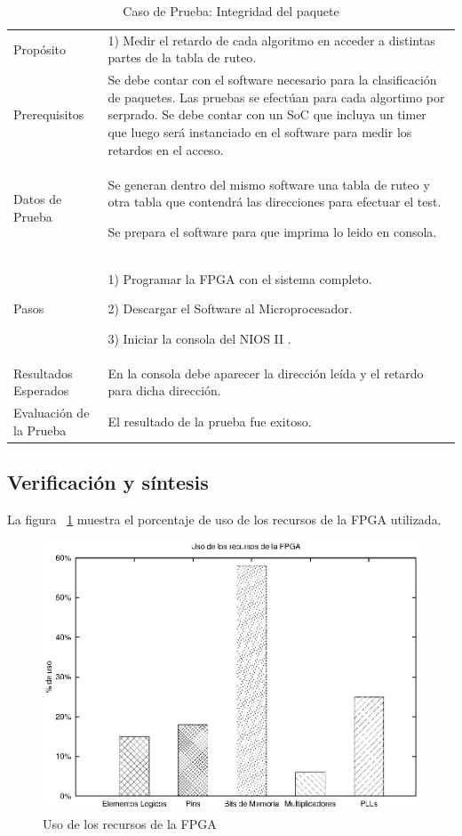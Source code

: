 \begin{table}
	\begin{tabular}{|>{\columncolor[gray]{0.8}}l|p{9cm}|} \hline
\multicolumn{2}{|>{\columncolor[gray]{0.8}}l|}{\textbf{Caso de Prueba: Retardo de lookup }}\\ \hline
Propósito  & 1) Medir el retardo de cada algoritmo en acceder a distintas partes de la tabla de ruteo. 

\\ \hline
 Prerequisitos  & Se debe contar con el software necesario para la clasificación de paquetes. Las pruebas se efectúan para cada algortimo por serprado. Se debe contar con un SoC que incluya un timer que luego será instanciado en el software para medir los retardos en el acceso.
 \\ \hline
 Datos de Prueba & Se generan dentro del mismo software una tabla de ruteo y otra tabla que contendrá las direcciones para efectuar el test. 

Se prepara el software para que imprima lo leido en consola. 
 \\ \hline
 Pasos & 1) Programar la FPGA con el sistema completo.

2) Descargar el Software al Microprocesador. 

3) Iniciar la consola del NIOS II .
\\ \hline
 Resultados Esperados & En la consola debe aparecer la dirección leída y el retardo para dicha dirección. \\ \hline
 Evaluación de la Prueba  & El resultado de la prueba fue exitoso.\\ \hline
	\end{tabular}
	\caption{Caso de Prueba: Integridad del paquete}
	\label{tab:testsoc}
\end{table}



\newpage
\subsection{Verificación y síntesis}

La figura ~\ref{fig:fpga} muestra el porcentaje de uso de los recursos de la FPGA utilizada.

\begin{figure}[H]
  \centering
	\includegraphics[scale=0.70]{4-implementacion/graf/fpga.eps}
  \caption{Uso de los recursos de la FPGA}
  \label{fig:fpga}
\end{figure}

